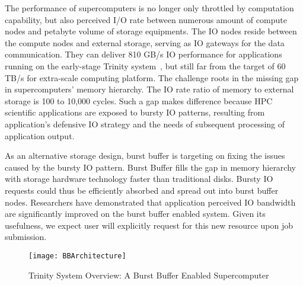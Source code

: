 The performance of supercomputers is no longer only throttled by computation capability,
but also perceived I/O rate between
numerous amount of compute nodes and 
petabyte volume of storage equipments.
The IO nodes reside between the compute nodes and external storage, 
serving as IO gateways for the data communication. 
They can deliver 810 GB/s IO performance for applications running on the early-stage Trinity system~\cite{TrinitySystem}, 
but still far from the target of 60 TB/s
for extra-scale computing platform\cite{Shalf:HPCCS:2010}.
The challenge roots in the missing gap in supercomputers' memory hierarchy.
The IO rate ratio of memory to external storage 
is 100 to 10,000 cycles\cite{TrinitySystem}.
Such a gap makes difference because HPC scientific applications are exposed to
bursty IO patterns\cite{Carns:MSST:2011, Kim:PDSW:2010},
resulting from application's
defensive IO strategy\cite{Latham:CSD:2012, Naik:ICPPW:2009, Dennis:CUG:2009}
and the needs of subsequent processing of application output.


As an alternative storage design, burst buffer\cite{Bent:HBP:2011, Grider:EXA:2010}
is targeting on fixing the issues caused by the bursty IO pattern.
Burst Buffer fills the gap in memory hierarchy with storage hardware technology
faster than traditional disks.
Bursty IO requests could thus be efficiently absorbed and spread out
into burst buffer nodes.
Researchers\cite{Liu:MSST:2012} have demonstrated that application perceived IO
bandwidth are significantly improved on the burst buffer enabled system.
Given its usefulness, we expect user will explicitly request for
this new resource upon job submission.

\begin{figure}[!t]
        \centering
        \texttt{[image: BBArchitecture]}
        \caption{Trinity System Overview: A Burst Buffer Enabled Supercomputer}
        \label{Fig:BBArchitecture}
\end{figure}





